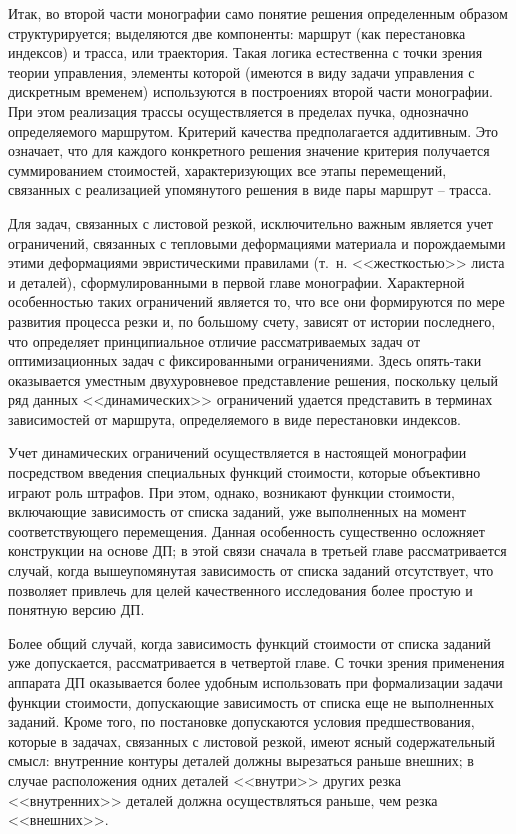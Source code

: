 \documentclass[11pt,twoside,openany]{report}
\begin{document}
Итак, во второй части монографии само понятие
решения определенным образом структурируется;
выделяются две компоненты:
маршрут
(как перестановка индексов)
и трасса,
или траектория.
Такая логика естественна с точки зрения теории управления,
элементы которой (имеются в виду задачи управления с дискретным временем)
используются в построениях второй части монографии.
При этом реализация трассы осуществляется в пределах пучка,
однозначно определяемого маршрутом.
Критерий качества предполагается аддитивным.
Это означает, что для каждого конкретного решения
значение критерия получается суммированием стоимостей,
характеризующих все этапы перемещений,
связанных с реализацией упомянутого
решения в виде пары маршрут -- трасса.

Для задач, связанных с листовой резкой,
исключительно важным является учет ограничений,
связанных с тепловыми деформациями материала
и порождаемыми этими деформациями эвристическими правилами
(т.~н. <<жесткостью>> листа и деталей),
сформулированными в первой главе монографии.
Характерной особенностью таких ограничений
является то, что все они формируются по мере
развития процесса резки и, по большому счету,
зависят от истории последнего, что определяет
принципиальное отличие рассматриваемых задач от
оптимизационных задач с фиксированными ограничениями.
Здесь опять-таки оказывается уместным двухуровневое представление решения,
поскольку целый ряд данных <<динамических>> ограничений удается представить
в терминах зависимостей от маршрута,
определяемого в виде перестановки индексов.

Учет динамических ограничений
осуществляется в настоящей монографии
посредством введения специальных функций стоимости,
которые объективно играют роль штрафов.
При этом, однако, возникают функции стоимости,
включающие зависимость от списка заданий,
уже выполненных на момент соответствующего перемещения.
Данная особенность существенно осложняет конструкции на основе ДП;
в этой связи сначала в третьей главе рассматривается случай,
когда вышеупомянутая зависимость от списка заданий отсутствует,
что позволяет привлечь для целей качественного исследования
более простую и понятную версию ДП.

Более общий случай,
когда зависимость функций стоимости от
списка заданий уже допускается,
рассматривается в четвертой главе.
С точки зрения применения аппарата ДП
оказывается более удобным использовать
при формализации задачи функции стоимости,
допускающие зависимость от списка еще не выполненных заданий.
Кроме того, по постановке допускаются условия предшествования,
которые в задачах, связанных с листовой резкой,
имеют ясный содержательный смысл:
внутренние контуры деталей должны вырезаться раньше внешних;
в случае расположения одних деталей <<внутри>> других
резка <<внутренних>> деталей должна осуществляться раньше,
чем резка <<внешних>>.
\end{document}
